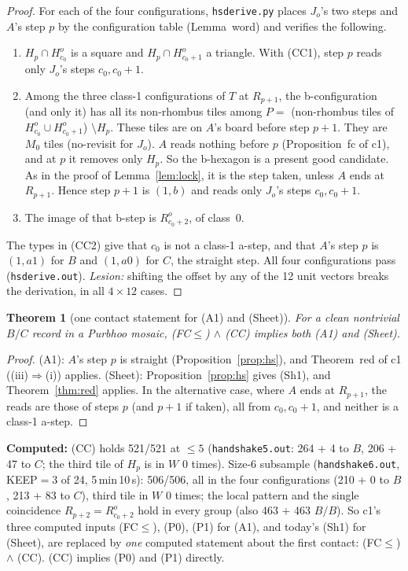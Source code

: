\documentclass[11pt]{article}
\newtheorem{theorem}{Theorem}\newtheorem{lemma}[theorem]{Lemma}\newtheorem{proposition}[theorem]{Proposition}
\theoremstyle{definition}\newtheorem{definition}[theorem]{Definition}\newtheorem{remark}[theorem]{Remark}
\begin{document}
\begin{proof}
For each of the four configurations, \texttt{hsderive.py} places $J_o$'s two steps and $A$'s step $p$ by the configuration table (Lemma~word) and verifies the following.
\begin{enumerate}
\item $H_p\cap H^o_{c_0}$ is a square and $H_p\cap H^o_{c_0+1}$ a triangle. With (CC1), step $p$ reads only $J_o$'s steps $c_0,c_0+1$.
\item Among the three class-1 configurations of $T$ at $R_{p+1}$, the b-configuration (and only it) has all its non-rhombus tiles among $P=$ (non-rhombus tiles of $H^o_{c_0}\cup H^o_{c_0+1}$) $\setminus H_p$.
These tiles are on $A$'s board before step $p+1$. They are $M_0$ tiles (no-revisit for $J_o$). $A$ reads nothing before $p$ (Proposition~fc of c1), and at $p$ it removes only $H_p$. So the b-hexagon is a present good candidate. As in the proof of Lemma~\ref{lem:lock}, it is the step taken, unless $A$ ends at $R_{p+1}$. Hence step $p+1$ is $(1,b)$ and reads only $J_o$'s steps $c_0,c_0+1$.
\item The image of that b-step is $R^o_{c_0+2}$, of class~0.
\end{enumerate}
The types in (CC2) give that $c_0$ is not a class-1 a-step, and that $A$'s step $p$ is $(1,a1)$ for $B$ and $(1,a0)$ for $C$, the straight step. All four configurations pass (\texttt{hsderive.out}).
\emph{Lesion:} shifting the offset by any of the 12 unit vectors breaks the derivation, in all $4\times12$ cases.
\end{proof}
\begin{theorem}[one contact statement for (A1) and (Sheet)]\label{thm:cc}
For a clean nontrivial $B/C$ record in a Purbhoo mosaic, \textup{(FC$\le$)} $\wedge$ \textup{(CC)} implies both (A1) and (Sheet).
\end{theorem}
\begin{proof}
(A1): $A$'s step $p$ is straight (Proposition~\ref{prop:hs}), and Theorem~red of c1 ((iii)$\Rightarrow$(i)) applies.
(Sheet): Proposition~\ref{prop:hs} gives (Sh1), and Theorem~\ref{thm:red} applies. In the alternative case, where $A$ ends at $R_{p+1}$, the reads are those of steps $p$ (and $p+1$ if taken), all from $c_0,c_0+1$, and neither is a class-1 a-step.
\end{proof}
\noindent\textbf{Computed:} (CC) holds 521/521 at $\le5$ (\texttt{handshake5.out}: 264 + 4 to $B$, 206 + 47 to $C$; the third tile of $H_p$ is in $W$ 0 times). Size-6 subsample (\texttt{handshake6.out}, KEEP${}=3$ of 24, 5\,min\,10\,s): 506/506, all in the four configurations (210 + 0 to $B$, 213 + 83 to $C$), third tile in $W$ 0 times; the local pattern and the single coincidence $R_{p+2}=R^o_{c_0+2}$ hold in every group (also 463 + 463 $B/B$).
So c1's three computed inputs (FC$\le$), (P0), (P1) for (A1), and today's (Sh1) for (Sheet), are replaced by \emph{one} computed statement about the first contact: (FC$\le$) $\wedge$ (CC). (CC) implies (P0) and (P1) directly.
\end{document}
